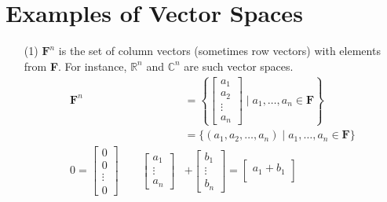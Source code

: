 \documentclass[11pt]{article}
\begin{document}
    \pagebreak

    \section{Examples of Vector Spaces}

    \begin{enumerate}
        \item[(1)] \(\textbf{F}^n\) is the set of column vectors (sometimes row vectors) with elements from \textbf{F}. For instance, \(\mathbb{R}^n\) and \(\mathbb{C}^n\) are such vector spaces.
        \begin{align*}
            \textbf{F}^n &= \left\{ \begin{bmatrix}
                                        a_1    \\
                                        a_2    \\
                                        \vdots \\
                                        a_n
                                    \end{bmatrix} \mid a_1, \dots, a_n \in \textbf{F} \right\} \\
                         &= \{(a_1, a_2, \dots, a_n) \mid a_1, \dots, a_n \in \textbf{F}\}     \\
            0            = \begin{bmatrix}
                                0      \\
                                0      \\
                                \vdots \\
                                0
                            \end{bmatrix} \qquad
            \begin{bmatrix}
                a_1    \\
                \vdots \\
                a_n
            \end{bmatrix} &+ \begin{bmatrix}
                                b_1    \\
                                \vdots \\
                                b_n
                            \end{bmatrix} = \begin{bmatrix}
                                                a_1 + b_1 \\

\end{bmatrix}
\end{align*}
\end{enumerate}
\end{document}
